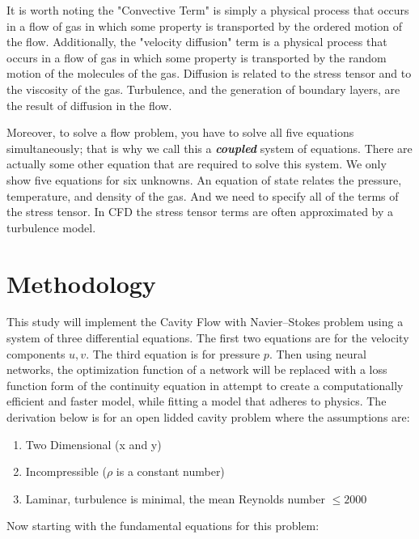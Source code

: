 \documentclass{article}
\begin{document}
    It is worth noting the "Convective Term" is simply a physical process that occurs in a flow of gas in which some property is transported by the ordered motion of the flow.\cite{NASA}
    Additionally, the "velocity diffusion" term is a physical process that occurs in a flow of gas in which some property is transported by the random motion of the molecules of the gas. Diffusion is related to the stress tensor and to the viscosity of the gas. Turbulence, and the generation of boundary layers, are the result of diffusion in the flow.
    
    Moreover, to solve a flow problem, you have to solve all five equations simultaneously; that is why we call this a \textit{\textbf{coupled}} system of equations. There are actually some other equation that are required to solve this system. We only show five equations for six unknowns. An equation of state relates the pressure, temperature, and density of the gas. And we need to specify all of the terms of the stress tensor. In CFD the stress tensor terms are often approximated by a turbulence model. \cite{NASA}
    
	\section{Methodology\cite{Barba2019}}\label{methodology}
	
	This study will implement the Cavity Flow with Navier–Stokes problem using a system of three differential equations. The first two equations are for the velocity components $u,v$. The third equation is for pressure $p$. Then using neural networks, the optimization function of a network will be replaced with a loss function form of the continuity equation in attempt to create a computationally efficient and faster model, while fitting a model that adheres to physics. The derivation below is for an open lidded cavity problem where the assumptions are:
	
	\begin{enumerate}
	    \item Two Dimensional (x and y)
	    \item Incompressible ($\rho$ is a constant number)
	    \item Laminar, turbulence is minimal, the mean Reynolds number $\le 2000$
	\end{enumerate} 
	   
	\noindent Now starting with the fundamental equations for this problem:\\
	
\end{document}

